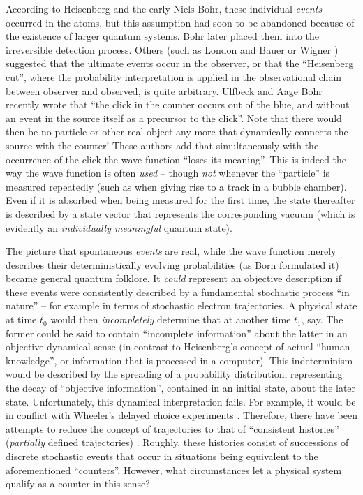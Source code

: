\documentclass[12pt]{article}
\begin{document}
According to Heisenberg and the
early Niels Bohr, these individual {\it events} occurred in the atoms,
but this assumption had soon to be abandoned because of the existence
of larger quantum systems. Bohr later placed them into the
irreversible detection process. Others (such as London and Bauer
\cite{London} or Wigner
\cite{Wigner}) suggested that the ultimate events occur in the
observer, or that the ``Heisenberg cut'', where the probability
interpretation is applied in the observational chain between observer
and observed, is quite arbitrary. Ulfbeck and Aage Bohr \cite{UB}
recently wrote that ``the click  in the counter occurs out of the
blue, and without an event in the source itself as a precursor to the
click''. Note that there would then be no particle or other real
object any more that dynamically connects the source with the counter!
These authors add that simultaneously with the occurrence of the
click the wave function ``loses its meaning''. This is indeed the way
the wave function is often {\it used} -- though {\it not} whenever the
``particle'' is measured repeatedly (such as when giving rise to a
track in a bubble chamber). Even if it is absorbed when being measured
for the first time, the state thereafter is
described by a state vector that represents the
corresponding vacuum (which is evidently an {\it individually
meaningful} quantum state).


The picture that spontaneous {\it
events} are real, while the wave function merely describes their
deterministically evolving probabilities (as Born formulated
it) became general quantum folklore. It {\it could} represent an
objective description if these events were consistently described
by a fundamental stochastic process ``in nature'' -- for example in
terms of stochastic electron trajectories. A physical state at time
$t_0$ would then {\it incompletely} determine that at another time
$t_1$, say. The former could be said to contain ``incomplete
information'' about the latter in an objective dynamical sense (in
contrast to Heisenberg's concept of actual ``human knowledge'', or
information that is processed in a computer). This indeterminism would
be described by the spreading of a probability distribution,
representing the decay of ``objective information'', contained in an
initial state, about the later state. Unfortunately, this dynamical
interpretation fails. For example, it would be in conflict with
Wheeler's delayed choice experiments
\cite{frontiers}. Therefore, there have been attempts to reduce the
concept of trajectories to that of ``consistent
histories'' ({\it partially} defined trajectories)
\cite{Griffiths}. Roughly, these histories consist of successions
of discrete stochastic events that occur in situations being equivalent
to the aforementioned ``counters''. However, what circumstances let a
physical system qualify as a counter in this sense?
\end{document}
